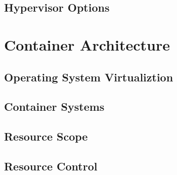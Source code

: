 \subsection{Hypervisor Options}
\label{sec:hypervisor_options}

\section{Container Architecture}
\label{sec:container_arch}

\subsection{Operating System Virtualiztion}
\label{sec:os_vt} 

\subsection{Container Systems}
\label{sec:container_systems}

\subsection{Resource Scope}
\label{sec:resource_scope} 

\subsection{Resource Control}
\label{sec:resource_control}



\nocite{_adams_1, _chowdhury_1, _perry_1, _grinberg_1} 

